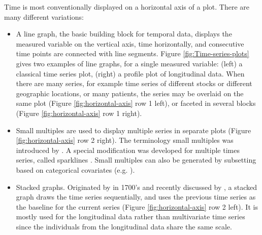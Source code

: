 \documentclass[12pt]{article}
\newcommand{\red}[1]{{\color{red} #1}}
\begin{document}
Time is most conventionally displayed on a horizontal axis of a plot. There are many different variations: 

\begin{itemize} \itemsep 0in
\item A line graph, the basic building block for temporal data, displays the measured variable on the vertical axis, time horizontally, and consecutive time points are connected with line segments. Figure \ref{fig:Time-series-plots} gives two examples of line graphs, for a single measured variable: (left) a classical time series plot, (right) a profile plot of longitudinal data. When there are many series, for example time series of different stocks or different geographic locations, or many patients, the series may be overlaid on the same plot (Figure \ref{fig:horizontal-axis} row 1 left), or faceted in several blocks (Figure \ref{fig:horizontal-axis} row 1 right). 


\item Small multiples are used to display multiple series in separate plots (Figure \ref{fig:horizontal-axis} row 2 right). The terminology small multiples was introduced by \citet{tufte1983visual}. A special modification was developed for multiple times series, called sparklines \citet{tufte2006evidence}. Small multiples can also be generated by subsetting based on categorical covariates (e.g. \citet{Cleveland1993}). 

\item Stacked graphs. Originated by \citeauthor{playfair2005playfair} in
1700's and recently discussed by \citet{byron2008stacked,javed2010graphical,heer2010tour},
a stacked graph draws the time series sequentially, and uses the previous
time series as the baseline for the current series (Figure \ref{fig:horizontal-axis} row 2 left). It is mostly used
for the longitudinal data rather than multivariate time series since
the individuals from the longitudinal data share the same scale.


\end{itemize}
\end{document}
